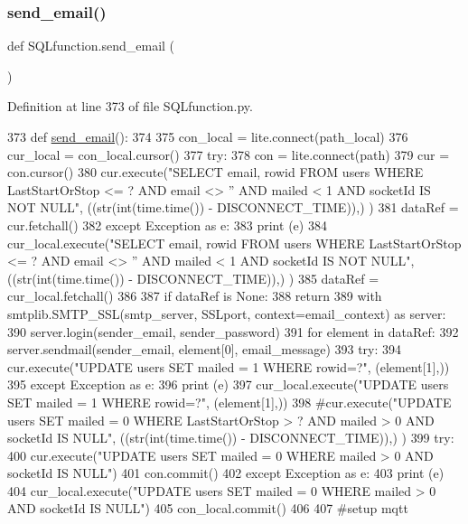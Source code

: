 \subsubsection{\texorpdfstring{send\+\_\+email()}{send\_email()}}
{\footnotesize\ttfamily def S\+Q\+Lfunction.\+send\+\_\+email (\begin{DoxyParamCaption}{ }\end{DoxyParamCaption})}



Definition at line 373 of file S\+Q\+Lfunction.\+py.


\begin{DoxyCode}
373 \textcolor{keyword}{def }\hyperlink{namespace_s_q_lfunction_a526fa5bc764d15233b0cc1880fc33f83}{send\_email}():
374     
375     con\_local = lite.connect(path\_local)
376     cur\_local = con\_local.cursor()
377     \textcolor{keywordflow}{try}:
378         con = lite.connect(path)
379         cur = con.cursor()
380         cur.execute(\textcolor{stringliteral}{"SELECT email, rowid FROM users WHERE LastStartOrStop <= ? AND email <> '' AND mailed <
       1 AND socketId IS NOT NULL"}, ((str(int(time.time()) - DISCONNECT\_TIME)),) )
381         dataRef = cur.fetchall()
382     \textcolor{keywordflow}{except} Exception \textcolor{keyword}{as} e:
383         \textcolor{keywordflow}{print} (e)        
384         cur\_local.execute(\textcolor{stringliteral}{"SELECT email, rowid FROM users WHERE LastStartOrStop <= ? AND email <> '' AND
       mailed < 1 AND socketId IS NOT NULL"}, ((str(int(time.time()) - DISCONNECT\_TIME)),) )
385         dataRef = cur\_local.fetchall()
386         
387     \textcolor{keywordflow}{if} dataRef \textcolor{keywordflow}{is} \textcolor{keywordtype}{None}:
388         \textcolor{keywordflow}{return}
389     with smtplib.SMTP\_SSL(smtp\_server, SSLport, context=email\_context) \textcolor{keyword}{as} server:
390         server.login(sender\_email, sender\_password)
391         \textcolor{keywordflow}{for} element \textcolor{keywordflow}{in} dataRef:            
392             server.sendmail(sender\_email, element[0], email\_message)
393             \textcolor{keywordflow}{try}:
394                 cur.execute(\textcolor{stringliteral}{"UPDATE users SET mailed = 1 WHERE rowid=?"}, (element[1],))
395             \textcolor{keywordflow}{except} Exception \textcolor{keyword}{as} e:
396                 \textcolor{keywordflow}{print} (e)
397             cur\_local.execute(\textcolor{stringliteral}{"UPDATE users SET mailed = 1 WHERE rowid=?"}, (element[1],))
398     \textcolor{comment}{#cur.execute("UPDATE users SET mailed = 0 WHERE LastStartOrStop > ? AND mailed > 0 AND socketId IS
       NULL", ((str(int(time.time()) - DISCONNECT\_TIME)),) ) }
399     \textcolor{keywordflow}{try}:
400         cur.execute(\textcolor{stringliteral}{"UPDATE users SET mailed = 0 WHERE mailed > 0 AND socketId IS NULL"}) 
401         con.commit()
402     \textcolor{keywordflow}{except} Exception \textcolor{keyword}{as} e:
403         \textcolor{keywordflow}{print} (e)
404     cur\_local.execute(\textcolor{stringliteral}{"UPDATE users SET mailed = 0 WHERE mailed > 0 AND socketId IS NULL"}) 
405     con\_local.commit()
406 
407 \textcolor{comment}{#setup mqtt}
\end{DoxyCode}

